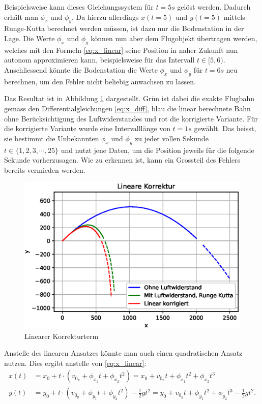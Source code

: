 Beispielsweise kann dieses Gleichungssystem für $t = 5s$ gelöst werden.
Dadurch erhält man $\phi_x$ und $\phi_y$.
Da hierzu allerdings $x(t=5)$ und $y(t=5)$ mittels Runge-Kutta berechnet werden müssen, ist dazu nur die Bodenstation in der Lage.
Die Werte $\phi_x$ und $\phi_y$ können nun aber dem Flugobjekt übertragen werden,
welches mit den Formeln \eqref{eq:x_linear} seine Position in naher Zukunft nun autonom approximieren kann,
beispielsweise für das Intervall $t \in [5,6)$.
Anschliessend könnte die Bodenstation die Werte $\phi_x$ und $\phi_y$ für $t=6s$ neu berechnen, um den Fehler nicht beliebig anwachsen zu lassen.

Das Resultat ist in Abbildung \ref{naive_linear_term} dargestellt.
Grün ist dabei die exakte Flugbahn gemäss den Differentialgleichungen \eqref{eq:x_diff},
blau die linear berechnete Bahn ohne Berücksichtigung des Luftwiderstandes und
rot die korrigierte Variante.
Für die korrigierte Variante wurde eine Intervalllänge von $t=1s$ gewählt.
Das heisst, sie bestimmt die Unbekannten $\phi_x$ und $\phi_y$ zu jeder vollen Sekunde $t \in \{1, 2, 3, \cdots, 25\}$ und nutzt jene Daten,
um die Position jeweils für die folgende Sekunde vorherzusagen.
Wie zu erkennen ist, kann ein Grossteil des Fehlers bereits vermieden werden.
\begin{figure}
    \centering
    \includegraphics[scale=0.7]{papers/perturbation/bilder/perturbation_fig1.eps}
    \caption{Linearer Korrekturterm}
	\label{naive_linear_term}
\end{figure}


Anstelle des linearen Ansatzes könnte man auch einen quadratischen Ansatz nutzen.
Dies ergibt anstelle von \eqref{eq:x_linear}:
\begin{equation}
\begin{aligned}
x(t) &= x_0 + t \cdot (v_{0_x} + \phi_{x_1}t + \phi_{x_2}t^2) = x_0 + v_{0_x}t + \phi_{x_1}t^2 + \phi_{x_2}t^3\\
y(t) &= y_0 + t \cdot (v_{0_y} + \phi_{y_1}t + \phi_{y_2}t^2) - \frac{1}{2}gt^2 = y_0 + v_{0_y}t + \phi_{y_1}t^2 + \phi_{y_2}t^3 - \frac{1}{2}gt^2.
\end{aligned}
\end{equation}


